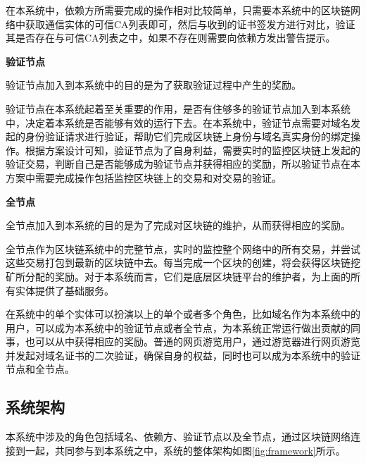 在本系统中，依赖方所需要完成的操作相对比较简单，只需要本系统中的区块链网络中获取通信实体的可信CA列表即可，然后与收到的证书签发方进行对比，验证其是否存在与可信CA列表之中，如果不存在则需要向依赖方发出警告提示。


\noindent\textbf{验证节点}

验证节点加入到本系统中的目的是为了获取验证过程中产生的奖励。

验证节点在本系统起着至关重要的作用，是否有住够多的验证节点加入到本系统中，决定着本系统是否能够有效的运行下去。在本系统中，验证节点需要对域名发起的身份验证请求进行验证，帮助它们完成区块链上身份与域名真实身份的绑定操作。根据方案设计可知，验证节点为了自身利益，需要实时的监控区块链上发起的验证交易，判断自己是否能够成为验证节点并获得相应的奖励，所以验证节点在本方案中需要完成操作包括监控区块链上的交易和对交易的验证。

\noindent\textbf{全节点}

全节点加入到本系统的目的是为了完成对区块链的维护，从而获得相应的奖励。

全节点作为区块链系统中的完整节点，实时的监控整个网络中的所有交易，并尝试这些交易打包到最新的区块链中去。每当完成一个区块的创建，将会获得区块链挖矿所分配的奖励。对于本系统而言，它们是底层区块链平台的维护者，为上面的所有实体提供了基础服务。


在系统中的单个实体可以扮演以上的单个或者多个角色，比如域名作为本系统中的用户，可以成为本系统中的验证节点或者全节点，为本系统正常运行做出贡献的同事，也可以从中获得相应的奖励。普通的网页游览用户，通过游览器进行网页游览并发起对域名证书的二次验证，确保自身的权益，同时也可以成为本系统中的验证节点和全节点。



\subsection{系统架构}


本系统中涉及的角色包括域名、依赖方、验证节点以及全节点，通过区块链网络连接到一起，共同参与到本系统之中，系统的整体架构如图\ref{fig:framework}所示。




